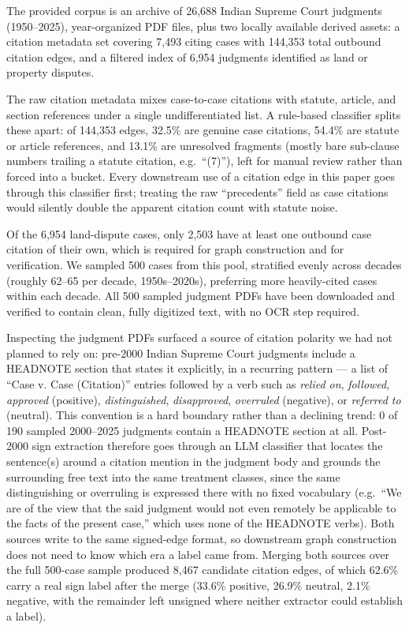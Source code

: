 \documentclass[10pt,conference]{IEEEtran}
\begin{document}
The provided corpus is an archive of 26,688 Indian Supreme Court judgments (1950--2025),
year-organized PDF files, plus two locally available derived assets: a citation metadata
set covering 7,493 citing cases with 144,353 total outbound citation edges, and a filtered
index of 6,954 judgments identified as land or property disputes.

The raw citation metadata mixes case-to-case citations with statute, article, and section
references under a single undifferentiated list. A rule-based classifier splits these
apart: of 144,353 edges, 32.5\% are genuine case citations, 54.4\% are statute or article
references, and 13.1\% are unresolved fragments (mostly bare sub-clause numbers trailing a
statute citation, e.g.\ ``(7)''), left for manual review rather than forced into a bucket.
Every downstream use of a citation edge in this paper goes through this classifier first;
treating the raw ``precedents'' field as case citations would silently double the apparent
citation count with statute noise.

Of the 6,954 land-dispute cases, only 2,503 have at least one outbound case citation of
their own, which is required for graph construction and for verification. We sampled 500
cases from this pool, stratified evenly across decades (roughly 62--65 per decade,
1950s--2020s), preferring more heavily-cited cases within each decade. All 500 sampled
judgment PDFs have been downloaded and verified to contain clean, fully digitized text,
with no OCR step required.

Inspecting the judgment PDFs surfaced a source of citation polarity we had not planned to
rely on: pre-2000 Indian Supreme Court judgments include a HEADNOTE section that states it
explicitly, in a recurring pattern --- a list of ``Case v. Case (Citation)'' entries
followed by a verb such as \emph{relied on}, \emph{followed}, \emph{approved} (positive),
\emph{distinguished}, \emph{disapproved}, \emph{overruled} (negative), or \emph{referred
to} (neutral). This convention is a hard boundary rather than a declining trend: 0 of 190
sampled 2000--2025 judgments contain a HEADNOTE section at all. Post-2000 sign extraction
therefore goes through an LLM classifier that locates the sentence(s) around a citation
mention in the judgment body and grounds the surrounding free text into the same
treatment classes, since the same distinguishing or overruling is expressed there with no
fixed vocabulary (e.g.\ ``We are of the view that the said judgment would not even
remotely be applicable to the facts of the present case,'' which uses none of the HEADNOTE
verbs). Both sources write to the same signed-edge format, so downstream graph
construction does not need to know which era a label came from. Merging both sources over
the full 500-case sample produced 8,467 candidate citation edges, of which 62.6\% carry a
real sign label after the merge (33.6\% positive, 26.9\% neutral, 2.1\% negative, with the
remainder left unsigned where neither extractor could establish a label).
\end{document}
